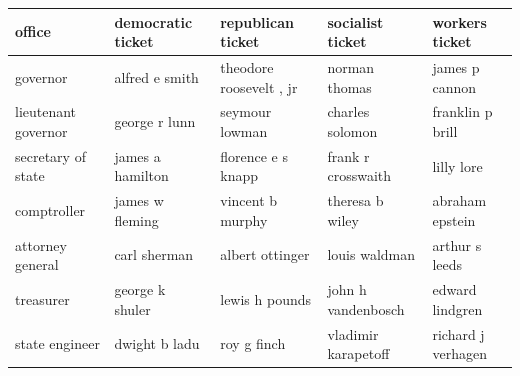 \documentclass{article}
\begin{document}
\begin{tabular}{lllll}
\toprule
office & democratic ticket & republican ticket & socialist ticket & workers ticket \\
\midrule
governor & alfred e smith & theodore roosevelt , jr & norman thomas & james p cannon \\
lieutenant governor & george r lunn & seymour lowman & charles solomon & franklin p brill \\
secretary of state & james a hamilton & florence e s knapp & frank r crosswaith & lilly lore \\
comptroller & james w fleming & vincent b murphy & theresa b wiley & abraham epstein \\
attorney general & carl sherman & albert ottinger & louis waldman & arthur s leeds \\
treasurer & george k shuler & lewis h pounds & john h vandenbosch & edward lindgren \\
state engineer & dwight b ladu & roy g finch & vladimir karapetoff & richard j verhagen \\
\bottomrule
\end{tabular}
\end{document}
